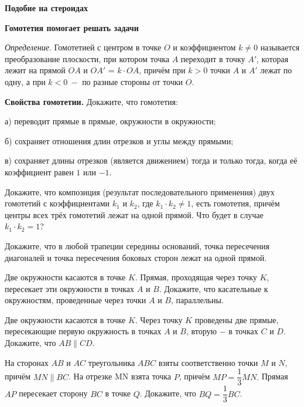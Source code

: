 \centerline{\Huge \bf  Подобие на стероидах}
\centerline{\Huge \bf Гомотетия помогает решать задачи}

\begin{flushright}
    \scriptsize{}
\end{flushright}


\textit{Определение}. Гомотетией с центром в точке $O$ и коэффициентом $k \neq 0$ называется преобразование плоскости, при котором точка $A$ переходит в точку $A'$, которая лежит на прямой $OA$ и $OA'$ = $k \cdot OA$, причём при $k > 0$ точки $A$ и $A'$ лежат по одну, а при $k < 0 \ -$ по разные стороны от точки $O.$

\noindent\textbf{Свойства гомотетии.} Докажите, что гомотетия:

а) переводит прямые в прямые, окружности в окружности; 

б) сохраняет отношения длин отрезков и углы между прямыми; 

в) сохраняет длины отрезков (является движением) тогда и только тогда, когда её коэффициент равен $1$ или $-1$.

Докажите, что композиция (результат последовательного применения) двух гомотетий с коэффициентами $k_1$ и $k_2$, где $k_1 \cdot k_2 \neq 1$, есть гомотетия, причём центры всех трёх гомотетий лежат на одной прямой. Что будет в случае $k_1 \cdot k_2 = 1$?

Докажите, что в любой трапеции середины оснований, точка пересечения диагоналей и точка пересечения боковых сторон лежат на одной прямой.

Две окружности касаются в точке $K$. Прямая, проходящая через точку $K$, пересекает эти окружности в точках $A$ и $B$. Докажите, что касательные к окружностям, проведенные через точки $A$ и $B$, параллельны.

Две окружности касаются в точке $K$. Через точку $K$ проведены две прямые, пересекающие первую окружность в точках $A$ и $B$, вторую $-$ в точках $C$ и $D$. Докажите, что $AB \parallel CD$.

 На сторонах $AB$ и $AC$ треугольника $ABC$ взяты соответственно точки $M$ и $N$, причём  $MN \parallel BC$.  На отрезке MN взята точка $P$, причём  $MP = \dfrac{1}{3}MN.$  Прямая $AP$ пересекает сторону $BC$ в точке $Q$. Докажите, что  $BQ = \dfrac{1}{3}BC$.